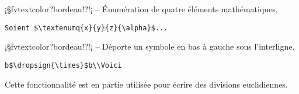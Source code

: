 \documentclass[11pt,a4paper,rgb]{report}
\begin{document}
\inCodeStub¡§fvtextcolor?bordeau!?!¡ -- Énumération de quatre éléments mathématiques.

\setlength{\leftskip}{.75cm}%
\setlength{\textwidth}{17.25cm}%

\colorbox{blue!15}{}
\hfill
\begin{minipage}{.65\textwidth}
	\begin{lstlisting}[linewidth=\textwidth, language={[LaTeX]TeX}]
	Soient $\textenumq{x}{y}{z}{\alpha}$...
	\end{lstlisting}
\end{minipage}

\setlength{\leftskip}{0pt}
\setlength{\textwidth}{18cm}%


\vspace*{.75cm}

\inCodeStub¡§fvtextcolor?bordeau!?!¡ -- Déporte un symbole en bas à gauche sous l'interligne.

\setlength{\leftskip}{.75cm}%
\setlength{\textwidth}{17.25cm}%

\colorbox{blue!15}{\hspace{.35cm}}
\hfill
\begin{minipage}{.65\textwidth}
	\begin{lstlisting}[linewidth=\textwidth, language={[LaTeX]TeX}]
	b$\dropsign{\times}$b\\Voici
	\end{lstlisting}
\end{minipage}

Cette fonctionnalité est en partie utilisée pour écrire des divisions euclidiennes.
\end{document}
